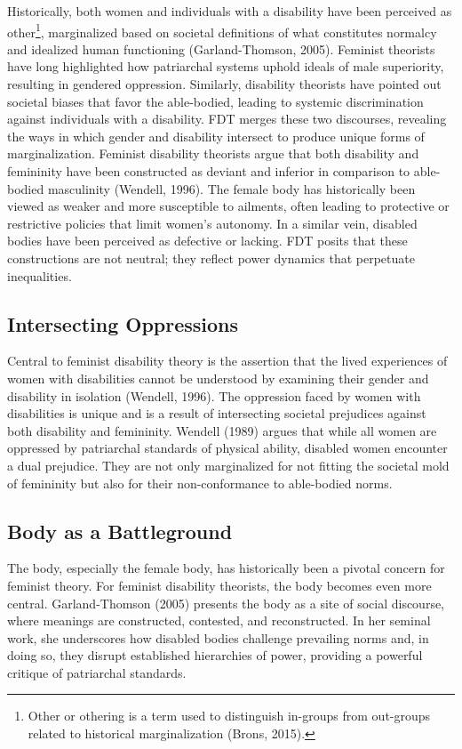 \documentclass{sig-alternate} %
\begin{document}
\begin{large}
Historically, both women and individuals with a disability have been perceived as other\footnote{ Other or othering is a term used to distinguish in-groups from out-groups related to historical marginalization (Brons, 2015).}, marginalized based on societal definitions of what constitutes normalcy and idealized human functioning (Garland-Thomson, 2005). Feminist theorists have long highlighted how patriarchal systems uphold ideals of male superiority, resulting in gendered oppression. Similarly, disability theorists have pointed out societal biases that favor the able-bodied, leading to systemic discrimination against individuals with a disability. FDT merges these two discourses, revealing the ways in which gender and disability intersect to produce unique forms of marginalization. Feminist disability theorists argue that both disability and femininity have been constructed as deviant and inferior in comparison to able-bodied masculinity (Wendell, 1996). The female body has historically been viewed as weaker and more susceptible to ailments, often leading to protective or restrictive policies that limit women's autonomy. In a similar vein, disabled bodies have been perceived as defective or lacking. FDT posits that these constructions are not neutral; they reflect power dynamics that perpetuate inequalities.

\subsection*{Intersecting Oppressions}

Central to feminist disability theory is the assertion that the lived experiences of women with disabilities cannot be understood by examining their gender and disability in isolation (Wendell, 1996). The oppression faced by women with disabilities is unique and is a result of intersecting societal prejudices against both disability and femininity. Wendell (1989) argues that while all women are oppressed by patriarchal standards of physical ability, disabled women encounter a dual prejudice. They are not only marginalized for not fitting the societal mold of femininity but also for their non-conformance to able-bodied norms.

\subsection*{Body as a Battleground}
The body, especially the female body, has historically been a pivotal concern for feminist theory. For feminist disability theorists, the body becomes even more central. Garland-Thomson (2005) presents the body as a site of social discourse, where meanings are constructed, contested, and reconstructed. In her seminal work, she underscores how disabled bodies challenge prevailing norms and, in doing so, they disrupt established hierarchies of power, providing a powerful critique of patriarchal standards.


\end{large}
\end{document}
